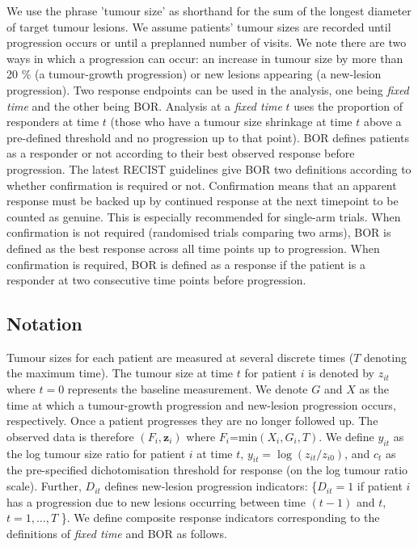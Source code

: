 \documentclass[10pt,A4]{article}
\begin{document}
We use the phrase 'tumour size' as shorthand for the sum of the longest diameter of target tumour lesions. We assume patients’ tumour sizes are recorded until progression occurs or until a preplanned number of visits. We note there are two ways in which a progression can occur: an increase in tumour size by more than 20 \% (a tumour-growth progression) or new lesions appearing (a new-lesion progression). Two response endpoints can be used in the analysis, one being \textit{fixed time} and the other being BOR. Analysis at a \textit{fixed time} $t$ uses the proportion of responders at time $t$ (those who have a tumour size shrinkage at time $t$ above a pre-defined threshold and no progression up to that point). BOR defines patients as a responder or not according to their best observed response before progression. The latest RECIST guidelines \cite{Eisenhauer2009} give BOR two definitions according to whether confirmation is required or not. Confirmation means that an apparent response must be backed up by continued response at the next timepoint to be counted as genuine. This is especially recommended for single-arm trials. When confirmation is not required (randomised trials comparing two arms), BOR is defined as the best response across all time points up to progression. When confirmation is required, BOR is defined as a response if the patient is a responder at two consecutive time points before progression.

\subsection{Notation}

Tumour sizes for each patient are measured at several discrete times ($T$ denoting the maximum time). The tumour size at time $t$ for patient $i$ is denoted by $z_{it}$ where $t=0$ represents the baseline measurement. We denote $G$ and $X$ as the time at which a tumour-growth progression and new-lesion progression occurs, respectively. Once a patient progresses they are no longer followed up. The observed data is therefore $(F_i, \textbf{z}_i)$ where $F_i$=min$(X_i,G_i,T)$. We define $y_{it}$ as the log tumour size ratio for patient $i$ at time $t$, $y_{it} =\log(z_{it}/z_{i0})$, and $c_t$ as the pre-specified dichotomisation threshold for response (on the log tumour ratio scale). Further, $D_{it}$ defines new-lesion progression indicators: \{$D_{it}=1$ if patient $i$ has a progression due to new lesions occurring between time $(t-1)$ and $t$, $t=1,\ldots,T$ \}. We define composite response indicators corresponding to the definitions of \textit{fixed time} and BOR as follows.
\end{document}
